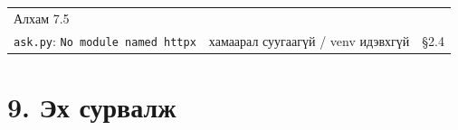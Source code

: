 \begin{longtable}[]{@{}lll@{}}
\begin{minipage}[t]{0.30\columnwidth}
Алхам 7.5\strut
\end{minipage}\tabularnewline
\begin{minipage}[t]{0.30\columnwidth}\raggedright
\texttt{ask.py}: \texttt{No\ module\ named\ \textquotesingle{}httpx\textquotesingle{}}\strut
\end{minipage} & \begin{minipage}[t]{0.30\columnwidth}\raggedright
хамаарал суугаагүй / venv идэвхгүй\strut
\end{minipage} & \begin{minipage}[t]{0.30\columnwidth}\raggedright
§2.4\strut
\end{minipage}\tabularnewline
\bottomrule
\end{longtable}\endgroup

\hypertarget{ux44dux445-ux441ux443ux440ux432ux430ux43bux436}{%
\section{9. Эх сурвалж}\label{ux44dux445-ux441ux443ux440ux432ux430ux43bux436}}

